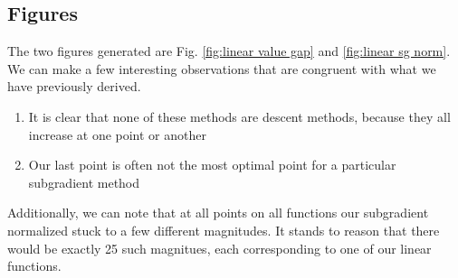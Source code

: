 \documentclass[journal,onecolumn]{IEEEtran}
\begin{document}
\subsection{Figures}\label{sec:linear example figs}
The two figures generated are Fig. \ref{fig:linear value gap} and \ref{fig:linear sg norm}. We can make a few interesting observations that are congruent with what we have previously derived.
\begin{enumerate}
    \item It is clear that none of these methods are descent methods, because they all increase at one point or another
    \item Our last point is often not the most optimal point for a particular subgradient method
\end{enumerate}
Additionally, we can note that at all points on all functions our subgradient normalized stuck to a few different magnitudes. It stands to reason that there would be exactly 25 such magnitues, each corresponding to one of our linear functions.
\end{document}
